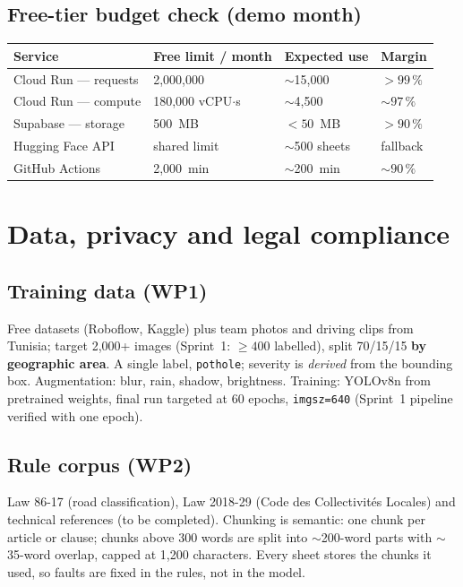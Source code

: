 \documentclass[11pt,a4paper,oneside]{report}
\begin{document}
\section{Free-tier budget check (demo month)}
\begin{longtable}{@{}L{4.6cm}L{3.4cm}L{3.2cm}L{2.8cm}@{}}
\toprule\textbf{Service} & \textbf{Free limit / month} & \textbf{Expected use} & \textbf{Margin}\\\midrule\endhead
Cloud Run --- requests & 2{,}000{,}000 & $\sim$15{,}000 & $>99\,\%$\\
Cloud Run --- compute & 180{,}000 vCPU$\cdot$s & $\sim$4{,}500 & $\sim97\,\%$\\
Supabase --- storage & 500~MB & $<50$~MB & $>90\,\%$\\
Hugging Face API & shared limit & $\sim$500 sheets & fallback\\
GitHub Actions & 2{,}000~min & $\sim$200~min & $\sim90\,\%$\\\bottomrule
\end{longtable}

\chapter{Data, privacy and legal compliance}
\section{Training data (WP1)}
Free datasets (Roboflow, Kaggle) plus team photos and driving clips from Tunisia; target 2{,}000+ images
(Sprint~1: $\geq400$ labelled), split 70/15/15 \textbf{by geographic area}. A single label, \texttt{pothole};
severity is \emph{derived} from the bounding box. Augmentation: blur, rain, shadow, brightness. Training:
YOLOv8n from pretrained weights, final run targeted at 60 epochs, \texttt{imgsz=640} (Sprint~1 pipeline verified with one epoch).

\section{Rule corpus (WP2)}
Law 86-17 (road classification), Law 2018-29 (Code des Collectivit\'es Locales) and technical references (to be
completed). Chunking is semantic: one chunk per article or clause; chunks above 300 words are split into
$\sim$200-word parts with $\sim$35-word overlap, capped at 1{,}200 characters. Every sheet stores the chunks it
used, so faults are fixed in the rules, not in the model.
\end{document}

